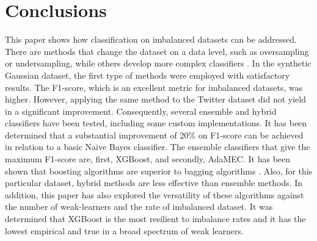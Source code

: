 \documentclass[conference]{IEEEtran}
\begin{document}


\section{Conclusions}
This paper shows how classification on imbalanced datasets can be addressed. There are methods that change the dataset on a data level, such as oversampling or undersampling, while others develop more complex classifiers %
. In the synthetic Gaussian dataset, the first type of methods were employed with satisfactory results. The F1-score, which is an excellent metric for imbalanced datasets, was higher. However, applying the same method to the Twitter dataset did not yield in a significant improvement. Consequently, several ensemble and hybrid classifiers have been tested, including some custom implementations. It has been determined that a substantial improvement of 20\% on F1-score can be achieved in relation to a basic Naive Bayes classifier. The ensemble classifiers that give the maximum F1-score are, first, XGBoost, and secondly, AdaMEC. It has been shown that boosting algorithms are superior to bagging algorithms%
. Also, for this particular dataset, hybrid methods are less effective than ensemble methods. In addition, this paper has also explored the versatility of these algorithms against the number of weak-learners and the rate of imbalanced dataset. It was determined that XGBoost is the most resilient to imbalance rates and it has the lowest empirical and true in a broad spectrum of weak learners.

\vspace{12pt}

 
\end{document}
